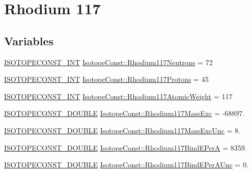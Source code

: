\hypertarget{group___isotope_const-_rhodium-_rh117}{}\section{Rhodium 117}
\label{group___isotope_const-_rhodium-_rh117}
\subsection*{Variables}
\begin{DoxyCompactItemize}
\item 
\mbox{\hyperlink{group___isotope_const-_macros_ga5f18360b3e99483a35c32d789e62621c}{I\+S\+O\+T\+O\+P\+E\+C\+O\+N\+S\+T\+\_\+\+I\+NT}} \mbox{\hyperlink{group___isotope_const-_rhodium-_rh117_gab08f919edd2b04a4e23d53d07b96f059}{Isotope\+Const\+::\+Rhodium117\+Neutrons}} = 72
\item 
\mbox{\hyperlink{group___isotope_const-_macros_ga5f18360b3e99483a35c32d789e62621c}{I\+S\+O\+T\+O\+P\+E\+C\+O\+N\+S\+T\+\_\+\+I\+NT}} \mbox{\hyperlink{group___isotope_const-_rhodium-_rh117_ga0ff22eeec3d2a799dd008fab423cb314}{Isotope\+Const\+::\+Rhodium117\+Protons}} = 45
\item 
\mbox{\hyperlink{group___isotope_const-_macros_ga5f18360b3e99483a35c32d789e62621c}{I\+S\+O\+T\+O\+P\+E\+C\+O\+N\+S\+T\+\_\+\+I\+NT}} \mbox{\hyperlink{group___isotope_const-_rhodium-_rh117_ga2a638598dc9a2027a28625b3c7a35dda}{Isotope\+Const\+::\+Rhodium117\+Atomic\+Weight}} = 117
\item 
\mbox{\hyperlink{group___isotope_const-_macros_ga8f45a7272ce02c0b4c65c44636ed719a}{I\+S\+O\+T\+O\+P\+E\+C\+O\+N\+S\+T\+\_\+\+D\+O\+U\+B\+LE}} \mbox{\hyperlink{group___isotope_const-_rhodium-_rh117_ga968abc23a44d5bb9ea31270336924f0c}{Isotope\+Const\+::\+Rhodium117\+Mass\+Exc}} = -\/68897.
\item 
\mbox{\hyperlink{group___isotope_const-_macros_ga8f45a7272ce02c0b4c65c44636ed719a}{I\+S\+O\+T\+O\+P\+E\+C\+O\+N\+S\+T\+\_\+\+D\+O\+U\+B\+LE}} \mbox{\hyperlink{group___isotope_const-_rhodium-_rh117_ga135e8dccd85326a77e9ebb769160566c}{Isotope\+Const\+::\+Rhodium117\+Mass\+Exc\+Unc}} = 8.
\item 
\mbox{\hyperlink{group___isotope_const-_macros_ga8f45a7272ce02c0b4c65c44636ed719a}{I\+S\+O\+T\+O\+P\+E\+C\+O\+N\+S\+T\+\_\+\+D\+O\+U\+B\+LE}} \mbox{\hyperlink{group___isotope_const-_rhodium-_rh117_ga9bbf665767334ec3ba6784e142fd5508}{Isotope\+Const\+::\+Rhodium117\+Bind\+E\+PerA}} = 8359.
\item 
\mbox{\hyperlink{group___isotope_const-_macros_ga8f45a7272ce02c0b4c65c44636ed719a}{I\+S\+O\+T\+O\+P\+E\+C\+O\+N\+S\+T\+\_\+\+D\+O\+U\+B\+LE}} \mbox{\hyperlink{group___isotope_const-_rhodium-_rh117_gaff588433bc7f54dcf0308c7c1b346d75}{Isotope\+Const\+::\+Rhodium117\+Bind\+E\+Per\+A\+Unc}} = 0.

\end{DoxyCompactItemize}
